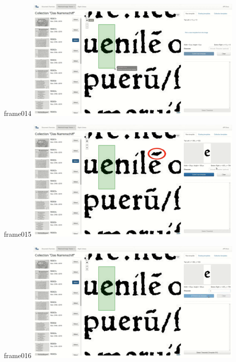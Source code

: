 \documentclass{beamer}
\begin{document}
\begin{frame}{frame014}
\includegraphics[width=0.8\textwidth]{output/exported-frames/frame014.png}
\note{}
\end{frame}

\begin{frame}{frame015}
\includegraphics[width=0.8\textwidth]{output/exported-frames/frame015.png}
\note{}
\end{frame}

\begin{frame}{frame016}
\includegraphics[width=0.8\textwidth]{output/exported-frames/frame016.png}
\note{}
\end{frame}
\end{document}
